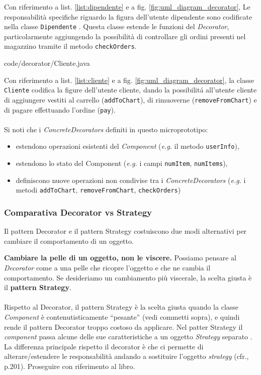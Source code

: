 \documentclass[12pt]{article}
\begin{document}
Con riferimento a list. \ref{list:dipendente} e a fig. \ref{fig:uml_diagram_decorator},
Le responsabilità specifiche riguardo la figura dell'utente dipendente
sono codificate nella classe {\tt Dipendente} \cite{gof_riferimento}. Questa classe estende le funzioni del {\em Decorator}, particolarmente aggiungendo la possibilità di controllare gli ordini presenti nel magazzino tramite il metodo {\tt checkOrders}.


{code/decorator/Cliente.java}

Con riferimento a list. \ref{list:cliente} e a fig. \ref{fig:uml_diagram_decorator}, la classe {\tt Cliente} codifica la figure dell'utente cliente, dando la possibilit\'a all'utente cliente di aggiungere vestiti al carrello ({\tt  addToChart}), di rimuoverne ({\tt removeFromChart}) e di pagare effettuando l'ordine ({\tt pay}).
\\
\\
Si noti che i {\em ConcreteDecorators} definiti in questo microprototipo:
\begin{itemize}
    \item estendono operazioni esistenti del {\em Component} ({\em e.g.} il metodo {\tt  userInfo}),
    \item estendono lo stato del Component ({\em e.g.} i campi {\tt numItem}, {\tt numItems}),
    \item definiscono nuove operazioni non condivise tra i {\em ConcreteDecorators} ({\em e.g.} i metodi {\tt addToChart}, {\tt removeFromChart}, {\tt checkOrders})
\end{itemize}


\subsubsection{Comparativa Decorator vs Strategy}
Il pattern Decorator e il pattern Strategy costuiscono due modi alternativi per cambiare il comportamento di un oggetto.


\textbf{Cambiare la pelle di un oggetto, non le viscere.} Possiamo pensare al {\em Decorator} come a una pelle che ricopre l'oggetto e che ne cambia il comportamento. Se desideriamo un cambiamento più viscerale, la scelta giusta è il \textbf{pattern Strategy}.
\\
\\
Rispetto al Decorator, il pattern Strategy è la scelta giusta quando la classe {\em Component} è contenutisticamente ``pesante'' (vedi commetti sopra), e quindi rende il pattern Decorator troppo costoso da applicare.
Nel patter Strategy il {\em component} passa alcune delle sue caratteristiche a un oggetto {\em Strategy} separato \cite{gof_sunt}.
La differenza principale rispetto il decorator è che ci permette di alterare/estendere le responsabilità andando a sostituire l'oggetto {\em strategy} (cfr.\cite{gof_riferimento}, p.201).
Proseguire con riferimento al libro.
\end{document}
